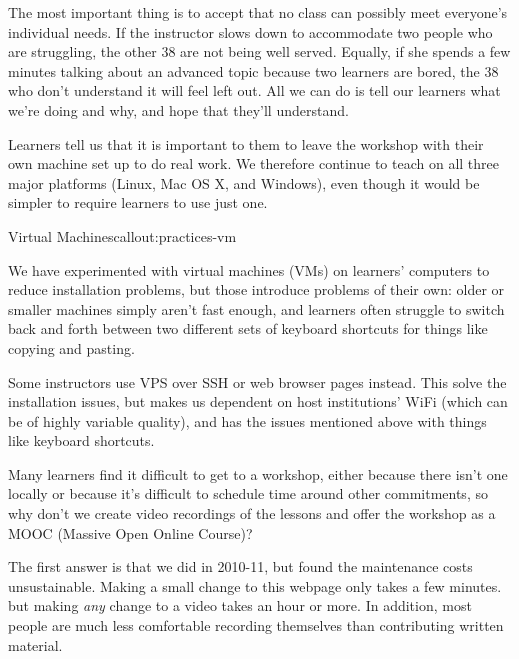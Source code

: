 The most important thing is to accept that no class can possibly meet
everyone's individual needs. If the instructor slows down to accommodate
two people who are struggling, the other 38 are not being well served.
Equally, if she spends a few minutes talking about an advanced topic
because two learners are bored, the 38 who don't understand it will feel
left out. All we can do is tell our learners what we're doing and why,
and hope that they'll understand.


Learners tell us that it is important to them to leave the workshop
with their own machine set up to do real work. We therefore continue
to teach on all three major platforms (Linux, Mac OS X, and Windows),
even though it would be simpler to require learners to use just one.


\begin{callout}{Virtual Machines}{callout:practices-vm}

We have experimented with virtual machines (VMs) on learners'
computers to reduce installation problems, but those introduce
problems of their own: older or smaller machines simply aren't fast
enough, and learners often struggle to switch back and forth between
two different sets of keyboard shortcuts for things like copying and
pasting.

Some instructors use VPS over SSH or web browser pages instead. This
solve the installation issues, but makes us dependent on host
institutions' WiFi (which can be of highly variable quality), and has
the issues mentioned above with things like keyboard shortcuts.

\end{callout}


Many learners find it difficult to get to a workshop, either because
there isn't one locally or because it's difficult to schedule time
around other commitments, so why don't we create video recordings of
the lessons and offer the workshop as a MOOC (Massive Open Online
Course)?

The first answer is that we did in 2010-11, but found the maintenance
costs unsustainable. Making a small change to this webpage only takes
a few minutes. but making \emph{any} change to a video takes an hour
or more. In addition, most people are much less comfortable recording
themselves than contributing written material.

